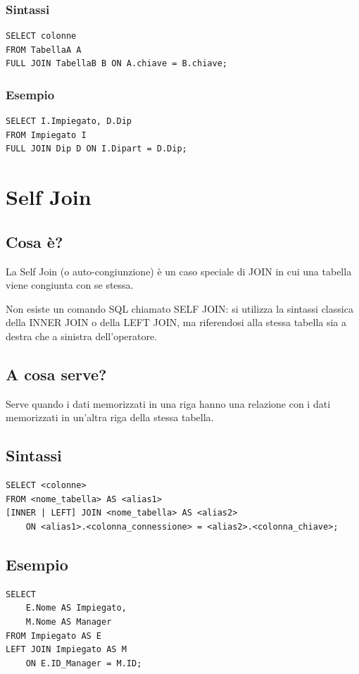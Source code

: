 \subsubsection{Sintassi}
\begin{lstlisting}[language=sql_generic]
SELECT colonne
FROM TabellaA A
FULL JOIN TabellaB B ON A.chiave = B.chiave;
\end{lstlisting}

\subsubsection{Esempio}
\begin{lstlisting}[language=sql_generic]
SELECT I.Impiegato, D.Dip
FROM Impiegato I
FULL JOIN Dip D ON I.Dipart = D.Dip;
\end{lstlisting}

\section{Self Join}
\subsection{Cosa è?}
La Self Join (o auto-congiunzione) è un caso speciale di JOIN in cui una tabella viene congiunta con se stessa.

Non esiste un comando SQL chiamato SELF JOIN: si utilizza la sintassi classica della INNER JOIN o della LEFT JOIN, ma riferendosi alla stessa tabella sia a destra che a sinistra dell'operatore.

\subsection{A cosa serve?}
Serve quando i dati memorizzati in una riga hanno una relazione con i dati memorizzati in un'altra riga della stessa tabella.

\subsection{Sintassi}
\begin{lstlisting}[language=sql_generic]
SELECT <colonne>
FROM <nome_tabella> AS <alias1>
[INNER | LEFT] JOIN <nome_tabella> AS <alias2>
    ON <alias1>.<colonna_connessione> = <alias2>.<colonna_chiave>;
\end{lstlisting}

\subsection{Esempio}
\begin{lstlisting}[language=sql_generic]
SELECT 
    E.Nome AS Impiegato, 
    M.Nome AS Manager
FROM Impiegato AS E
LEFT JOIN Impiegato AS M 
    ON E.ID_Manager = M.ID;
\end{lstlisting}

